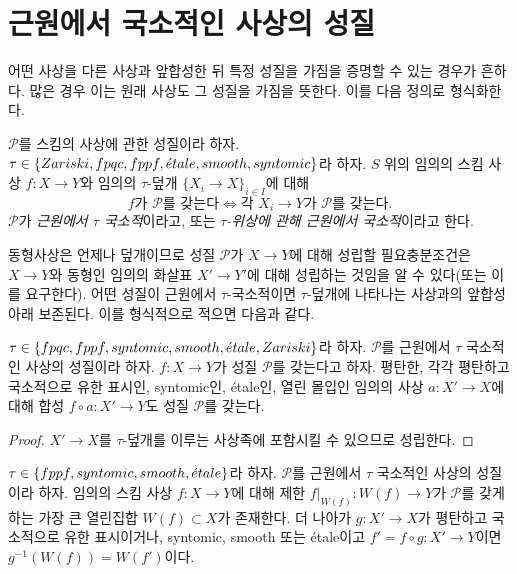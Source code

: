 \section{근원에서 국소적인 사상의 성질}
\label{section-properties-morphisms-local-source}

\noindent
어떤 사상을 다른 사상과 앞합성한 뒤 특정 성질을 가짐을 증명할 수 있는
경우가 흔하다. 많은 경우 이는 원래 사상도 그 성질을 가짐을 뜻한다.
이를 다음 정의로 형식화한다.

\begin{definition}
\label{definition-property-morphisms-local-source}
$\mathcal{P}$를 스킴의 사상에 관한 성질이라 하자.
$\tau \in \{Zariski, \linebreak[0] fpqc, \linebreak[0] fppf, \linebreak[0]
\etale, \linebreak[0] smooth, \linebreak[0] syntomic\}$라 하자. $S$ 위의
임의의 스킴 사상 $f : X \to Y$와 임의의 $\tau$-덮개
$\{X_i \to X\}_{i \in I}$에 대해
$$
f \text{가 }\mathcal{P}\text{를 갖는다}
\Leftrightarrow
\text{각 }X_i \to Y\text{가 }\mathcal{P}\text{를 갖는다}.
$$
$\mathcal{P}$가 {\it 근원에서 $\tau$ 국소적}이라고, 또는
{\it $\tau$-위상에 관해 근원에서 국소적}이라고 한다.
\end{definition}

\noindent
동형사상은 언제나 덮개이므로 성질 $\mathcal{P}$가 $X \to Y$에 대해
성립할 필요충분조건은 $X \to Y$와 동형인 임의의 화살표 $X' \to Y'$에
대해 성립하는 것임을 알 수 있다(또는 이를 요구한다). 어떤 성질이
근원에서 $\tau$-국소적이면 $\tau$-덮개에 나타나는 사상과의 앞합성 아래
보존된다. 이를 형식적으로 적으면 다음과 같다.

\begin{lemma}
\label{lemma-precompose-property-local-source}
$\tau \in \{fpqc, fppf, syntomic, smooth, {\acute{e}tale}, Zariski\}$라 하자.
$\mathcal{P}$를 근원에서 $\tau$ 국소적인 사상의 성질이라 하자.
$f : X \to Y$가 성질 $\mathcal{P}$를 갖는다고 하자. 평탄한, 각각
평탄하고 국소적으로 유한 표시인, syntomic인, \'etale인, 열린 몰입인
임의의 사상 $a : X' \to X$에 대해 합성 $f \circ a : X' \to Y$도
성질 $\mathcal{P}$를 갖는다.
\end{lemma}

\begin{proof}
$X' \to X$를 $\tau$-덮개를 이루는 사상족에 포함시킬 수 있으므로
성립한다.
\end{proof}

\begin{lemma}
\label{lemma-largest-open-of-the-source}
$\tau \in \{fppf, syntomic, smooth, {\acute{e}tale}\}$라 하자.
$\mathcal{P}$를 근원에서 $\tau$ 국소적인 사상의 성질이라 하자. 임의의
스킴 사상 $f : X \to Y$에 대해 제한 $f|_{W(f)} : W(f) \to Y$가
$\mathcal{P}$를 갖게 하는 가장 큰 열린집합 $W(f) \subset X$가 존재한다.
더 나아가 $g : X' \to X$가 평탄하고 국소적으로 유한 표시이거나,
syntomic, smooth 또는 \'etale이고 $f' = f \circ g : X' \to Y$이면
$g^{-1}(W(f)) = W(f')$이다.
\end{lemma}

